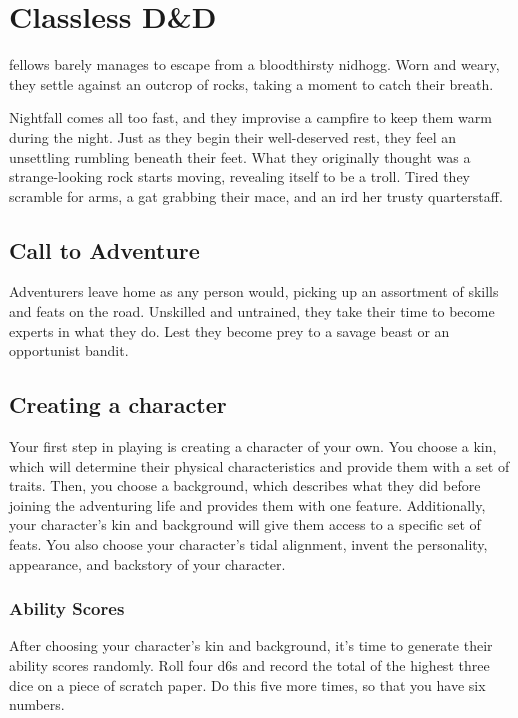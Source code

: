 \section{Classless D\&D} \label{sec::classlessdnd}
fellows barely manages to escape from a bloodthirsty nidhogg.
Worn and weary, they settle against an outcrop of rocks, taking a moment to catch their breath.

Nightfall comes all too fast, and they improvise a campfire to keep them warm during the night.
Just as they begin their well-deserved rest, they feel an unsettling rumbling beneath their feet.
What they originally thought was a strange-looking rock starts moving, revealing itself to be a troll.
Tired they scramble for arms, a gat grabbing their mace, and an ird her trusty quarterstaff.

\subsection*{Call to Adventure}
    Adventurers leave home as any person would, picking up an assortment of skills and feats on the road.
    Unskilled and untrained, they take their time to become experts in what they do.
    Lest they become prey to a savage beast or an opportunist bandit.

\subsection*{Creating a character}
    Your first step in playing is creating a character of your own.
    You choose a kin, which will determine their physical characteristics and provide them with a set of traits.
    Then, you choose a background, which describes what they did before joining the adventuring life and provides them with one feature.
    Additionally, your character's kin and background will give them access to a specific set of feats.
    You also choose your character's tidal alignment, invent the personality, appearance, and backstory of your character.

    \subsubsection{Ability Scores}
        After choosing your character's kin and background, it's time to generate their ability scores randomly.
        Roll four d6s and record the total of the highest three dice on a piece of scratch paper.
        Do this five more times, so that you have six numbers.

